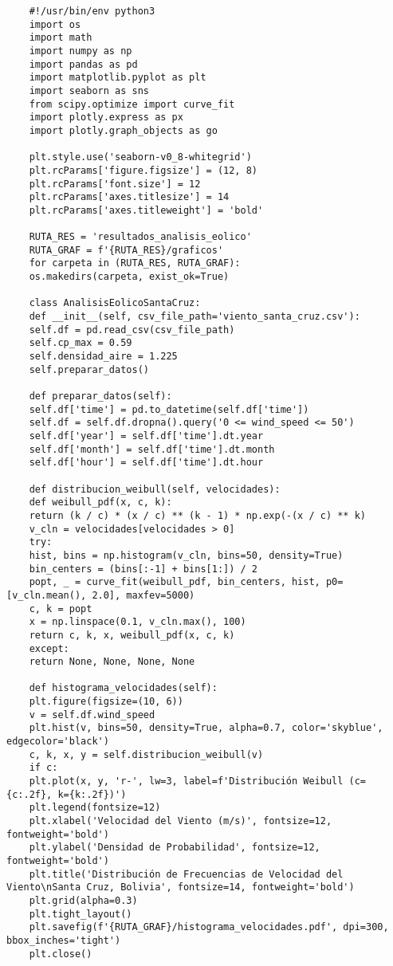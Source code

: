 \begin{lstlisting}
	#!/usr/bin/env python3
	import os
	import math
	import numpy as np
	import pandas as pd
	import matplotlib.pyplot as plt
	import seaborn as sns
	from scipy.optimize import curve_fit
	import plotly.express as px
	import plotly.graph_objects as go
	
	plt.style.use('seaborn-v0_8-whitegrid')
	plt.rcParams['figure.figsize'] = (12, 8)
	plt.rcParams['font.size'] = 12
	plt.rcParams['axes.titlesize'] = 14
	plt.rcParams['axes.titleweight'] = 'bold'
	
	RUTA_RES = 'resultados_analisis_eolico'
	RUTA_GRAF = f'{RUTA_RES}/graficos'
	for carpeta in (RUTA_RES, RUTA_GRAF):
	os.makedirs(carpeta, exist_ok=True)
	
	class AnalisisEolicoSantaCruz:
	def __init__(self, csv_file_path='viento_santa_cruz.csv'):
	self.df = pd.read_csv(csv_file_path)
	self.cp_max = 0.59
	self.densidad_aire = 1.225
	self.preparar_datos()
	
	def preparar_datos(self):
	self.df['time'] = pd.to_datetime(self.df['time'])
	self.df = self.df.dropna().query('0 <= wind_speed <= 50')
	self.df['year'] = self.df['time'].dt.year
	self.df['month'] = self.df['time'].dt.month
	self.df['hour'] = self.df['time'].dt.hour
	
	def distribucion_weibull(self, velocidades):
	def weibull_pdf(x, c, k):
	return (k / c) * (x / c) ** (k - 1) * np.exp(-(x / c) ** k)
	v_cln = velocidades[velocidades > 0]
	try:
	hist, bins = np.histogram(v_cln, bins=50, density=True)
	bin_centers = (bins[:-1] + bins[1:]) / 2
	popt, _ = curve_fit(weibull_pdf, bin_centers, hist, p0=[v_cln.mean(), 2.0], maxfev=5000)
	c, k = popt
	x = np.linspace(0.1, v_cln.max(), 100)
	return c, k, x, weibull_pdf(x, c, k)
	except:
	return None, None, None, None
	
	def histograma_velocidades(self):
	plt.figure(figsize=(10, 6))
	v = self.df.wind_speed
	plt.hist(v, bins=50, density=True, alpha=0.7, color='skyblue', edgecolor='black')
	c, k, x, y = self.distribucion_weibull(v)
	if c:
	plt.plot(x, y, 'r-', lw=3, label=f'Distribución Weibull (c={c:.2f}, k={k:.2f})')
	plt.legend(fontsize=12)
	plt.xlabel('Velocidad del Viento (m/s)', fontsize=12, fontweight='bold')
	plt.ylabel('Densidad de Probabilidad', fontsize=12, fontweight='bold')
	plt.title('Distribución de Frecuencias de Velocidad del Viento\nSanta Cruz, Bolivia', fontsize=14, fontweight='bold')
	plt.grid(alpha=0.3)
	plt.tight_layout()
	plt.savefig(f'{RUTA_GRAF}/histograma_velocidades.pdf', dpi=300, bbox_inches='tight')
	plt.close()
	

\end{lstlisting}
